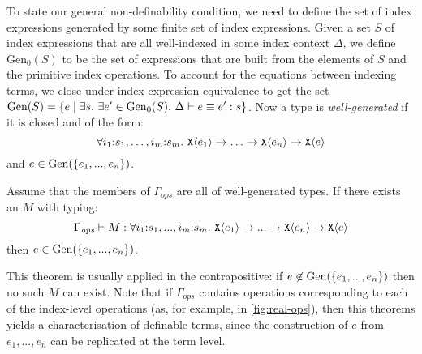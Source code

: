 To state our general non-definability condition, we need to define the
set of index expressions generated by some finite set of index
expressions. Given a set $S$ of index expressions that are all
well-indexed in some index context $\Delta$, we define
$\mathrm{Gen}_0(S)$ to be the set of expressions that are built from
the elements of $S$ and the primitive index operations. To account for
the equations between indexing terms, we close under index expression
equivalence to get the set $\Gen(S) = \{ e \sepbar \exists s.\ \exists
e' \in \mathrm{Gen}_0(S).\ \Delta \vdash e \equiv e' : s \}$. Now a
type is \emph{well-generated} if it is closed and of the form:
\begin{displaymath}
  \forall i_1\mathord:s_1,\ldots,i_m\mathord:s_m.~\textup{\texttt{X}}\langle e_1 \rangle \to \ldots \to \textup{\texttt{X}}\langle e_n \rangle \to \textup{\texttt{X}}\langle e \rangle
\end{displaymath}
and $e \in \mathrm{Gen}(\{e_1,...,e_n\})$.
\begin{theorem}\label{thm:general-nondef}
  Assume that the members of $\Gamma_{\mathit{ops}}$ are all of
  well-generated types. If there exists an $M$ with typing:
  \begin{displaymath}
    \Gamma_{\mathit{ops}} \vdash M : \forall i_1\mathord:s_1,...,i_m\mathord:s_m.~\textup{\texttt{X}}\langle e_1 \rangle \to ... \to \textup{\texttt{X}}\langle e_n \rangle \to \textup{\texttt{X}}\langle e \rangle
  \end{displaymath}
  then $e \in \mathrm{Gen}(\{e_1,...,e_n\})$.
\end{theorem}
This theorem is usually applied in the contrapositive: if $e \not\in
\mathrm{Gen}(\{e_1,...,e_n\})$ then no such $M$ can exist. Note that if
$\Gamma_{\mathit{ops}}$ contains operations corresponding to each of
the index-level operations (as, for example, in
\autoref{fig:real-ops}), then this theorems yields a characterisation
of definable terms, since the construction of $e$ from $e_1,...,e_n$
can be replicated at the term level.
